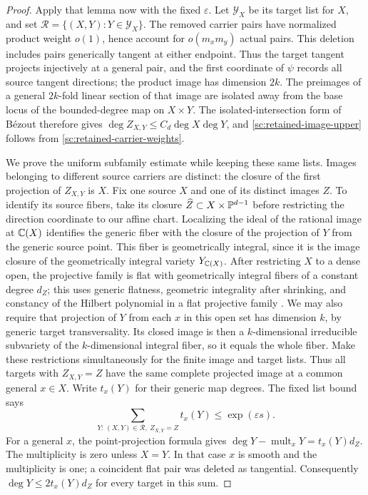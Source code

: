 \begin{proof}
Apply that lemma now with the fixed $\varepsilon$.  Let
$\mathcal Y_X$ be its target list for $X$, and set
$\mathcal R=\{(X,Y):Y\in\mathcal Y_X\}$.  The removed carrier pairs
have normalized product weight $o(1)$, hence account for $o(m_xm_y)$
actual pairs.  This deletion includes pairs generically tangent at either
endpoint.  Thus the target tangent projects injectively at a general pair,
and the first coordinate of $\psi$ records all source tangent directions;
the product image has dimension $2k$.  The preimages of a general
$2k$-fold linear section of that image are isolated away from the base
locus of the bounded-degree map on $X\times Y$.  The isolated-intersection
form of B\'ezout therefore gives
$\deg Z_{X,Y}\le C_d\deg X\deg Y$, and
\eqref{sc:retained-image-upper} follows from
\eqref{sc:retained-carrier-weights}.

We prove the uniform subfamily estimate while keeping these same lists.
Images belonging to different source carriers are distinct: the closure
of the first projection of $Z_{X,Y}$ is $X$.  Fix one source $X$ and one
of its distinct images $Z$.  To identify its source fibers, take its
closure $\widehat Z\subset X\times\mathbb P^{d-1}$ before restricting the
direction coordinate to our affine chart.  Localizing the ideal of the
rational image at $\mathbb C(X)$ identifies the generic fiber with the closure
of the projection of $Y$ from the generic source point.  This fiber is
geometrically integral, since it is the image closure of the geometrically
integral variety $Y_{\mathbb C(X)}$.  After restricting $X$ to a dense open,
the projective family is flat with geometrically integral fibers of a
constant degree $d_Z$; this uses generic flatness, geometric integrality after
shrinking, and constancy of the Hilbert polynomial in a flat projective
family \cite[Tags~052A, 0559, 0C0E, and 0B9T]{stacksproject}.
We may also require that projection of $Y$ from each $x$ in this open set
has dimension $k$, by generic target transversality.
Its closed image is then a $k$-dimensional irreducible subvariety of the
$k$-dimensional integral fiber, so it equals the whole fiber.  Make these
restrictions simultaneously for the finite image and target lists.
Thus all targets with $Z_{X,Y}=Z$ have the same complete projected image
at a common general $x\in X$.  Write $t_x(Y)$ for their generic map degrees.
The fixed list bound says
\[
 \sum_{Y:\,(X,Y)\in\mathcal R,\ Z_{X,Y}=Z}t_x(Y)
 \le \exp(\varepsilon s).
\]
For a general $x$, the point-projection formula gives
$\deg Y-\operatorname{mult}_xY=t_x(Y)d_Z$.
The multiplicity is zero unless $X=Y$.  In that case $x$ is smooth and
the multiplicity is one; a coincident flat pair was deleted as tangential.
Consequently $\deg Y\le2t_x(Y)d_Z$ for every target in this sum.


\end{proof}
